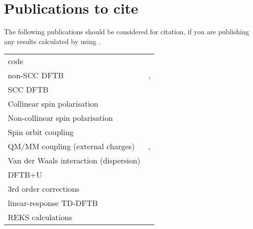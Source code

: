 \chapter{Publications to cite}

The following publications should be considered for citation, if you
are publishing any results calculated by using \dftbp.


\begin{tabular}{lr}
\dftbp{} code & \cite{dftbp-paper} \\
non-SCC DFTB & \cite{porezag-PRB-51-12947}, \cite{seifert-ijqc-58-185}
\\
SCC DFTB & \cite{elstner-prb-58-7260} \\
Collinear spin polarisation & \cite{koehler-cp-309-23} \\
Non-collinear spin polarisation & \cite{koehler-JPCA-111-5622} \\
Spin orbit coupling & \cite{koehler-JPCA-111-5622} \\
QM/MM coupling (external charges) & \cite{cui-jpcb-105-569},
\cite{han-ijqc-78-459} \\
Van der Waals interaction (dispersion) & \cite{elstner-jcp-114-5149} \\
DFTB+U & \cite{hourahine07}\\
3rd order corrections & \cite{yang-JPCA-111-10861} \\
linear-response TD-DFTB  & \cite{niehaus-prb-63-085108}\\
REKS calculations & \cite{Lee_JCTC_2019} \\
\end{tabular}


